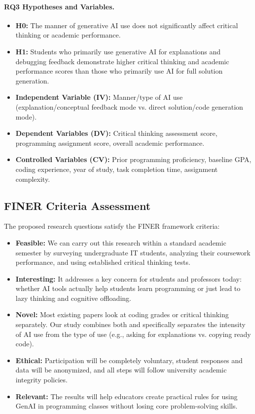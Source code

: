 \documentclass[11pt,a4paper]{article}
\begin{document}
\paragraph{RQ3 Hypotheses and Variables.}
\begin{itemize}[leftmargin=*, itemsep=0.1em]
  \item \textbf{H0:} The manner of generative AI use does not significantly affect critical thinking or academic performance.
  \item \textbf{H1:} Students who primarily use generative AI for explanations and debugging feedback demonstrate higher critical thinking and academic performance scores than those who primarily use AI for full solution generation.
  \item \textbf{Independent Variable (IV):} Manner/type of AI use (explanation/conceptual feedback mode vs. direct solution/code generation mode).
  \item \textbf{Dependent Variables (DV):} Critical thinking assessment score, programming assignment score, overall academic performance.
  \item \textbf{Controlled Variables (CV):} Prior programming proficiency, baseline GPA, coding experience, year of study, task completion time, assignment complexity.
\end{itemize}

\subsection*{FINER Criteria Assessment}
The proposed research questions satisfy the FINER framework criteria:
\begin{itemize}[leftmargin=*, itemsep=0.2em]
  \item \textbf{Feasible:} We can carry out this research within a standard academic semester by surveying undergraduate IT students, analyzing their coursework performance, and using established critical thinking tests.
  \item \textbf{Interesting:} It addresses a key concern for students and professors today: whether AI tools actually help students learn programming or just lead to lazy thinking and cognitive offloading.
  \item \textbf{Novel:} Most existing papers look at coding grades or critical thinking separately. Our study combines both and specifically separates the intensity of AI use from the type of use (e.g., asking for explanations vs. copying ready code).
  \item \textbf{Ethical:} Participation will be completely voluntary, student responses and data will be anonymized, and all steps will follow university academic integrity policies.
  \item \textbf{Relevant:} The results will help educators create practical rules for using GenAI in programming classes without losing core problem-solving skills.
\end{itemize}
\end{document}
